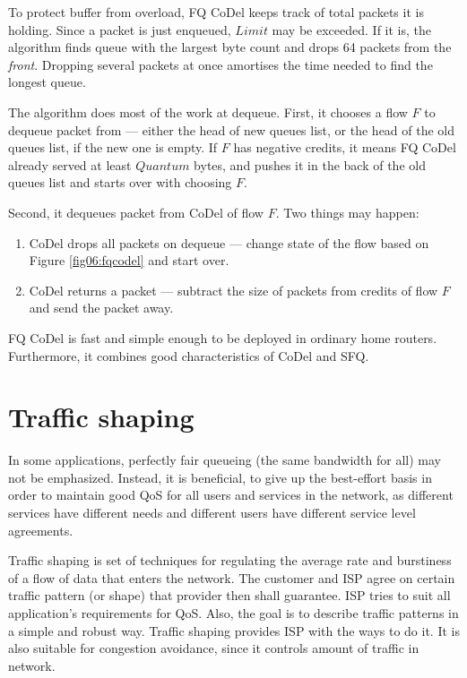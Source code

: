 To protect buffer from overload, FQ CoDel keeps track of total packets it is holding. Since a packet is just enqueued, $Limit$ may be exceeded. If it is, the algorithm finds queue with the largest byte count and drops 64 packets from the \textit{front}. Dropping several packets at once amortises the time needed to find the longest queue.

The algorithm does most of the work at dequeue. First, it chooses a flow $F$ to dequeue packet from --- either the head of new queues list, or the head of the old queues list, if the new one is empty. If $F$ has negative credits, it means FQ CoDel already served at least $Quantum$ bytes, and pushes it in the back of the old queues list and starts over with choosing $F$.

Second, it dequeues packet from CoDel of flow $F$. Two things may happen:
\begin{enumerate}
	\item CoDel drops all packets on dequeue --- change state of the flow based on Figure \ref{fig06:fqcodel} and start over.
	\item CoDel returns a packet --- subtract the size of packets from credits of flow $F$ and send the packet away.
\end{enumerate}

FQ CoDel is fast and simple enough to be deployed in ordinary home routers. Furthermore, it combines good characteristics of CoDel and SFQ.

\section{Traffic shaping}

In some applications, perfectly fair queueing (the same bandwidth for all) may not be emphasized. Instead, it is beneficial, to give up the best-effort basis in order to maintain good QoS for all users and services in the network, as different services have different needs and different users have different service level agreements. 

Traffic shaping is set of techniques for regulating the average rate and burstiness of a flow of data that enters the network. The customer and ISP agree on certain traffic pattern (or shape) that provider then shall guarantee. ISP tries to suit all application's requirements for QoS. Also, the goal is to describe traffic patterns in a simple and robust way. Traffic shaping provides ISP with the ways to do it. It is also suitable for congestion avoidance, since it controls amount of traffic in network.

